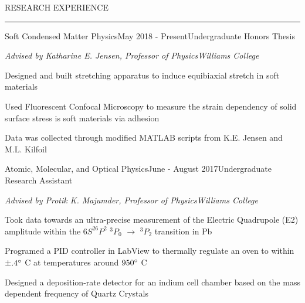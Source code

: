 \documentclass{resume} %
\renewenvironment{rSection}[1]{
	\sectionskip
	\textcolor{RoyalPurple}{\MakeUppercase{#1}}
	\sectionlineskip
	\hrule
	\begin{list}{}{
			\setlength{\leftmargin}{1.5em}
		}
		\item[]
	}{
	\end{list}
}
\begin{document}

	
	\begin{rSection}{Research Experience}
		
		\begin{rSubsection}{Soft Condensed Matter Physics}{May 2018 - Present}{Undergraduate Honors Thesis}{}
			\vspace{-.5em}
				\item[] {\em Advised by Katharine E. Jensen, Professor of Physics}\hfill {\em Williams College}
				\item Designed and built stretching apparatus to induce equibiaxial stretch in soft materials
				\item Used Fluorescent Confocal Microscopy to measure the strain dependency of solid surface stress is soft materials via adhesion
				\item Data was collected through modified MATLAB scripts from K.E. Jensen and M.L. Kilfoil
		
		\end{rSubsection}
%		


		\begin{rSubsection}{Atomic, Molecular, and Optical Physics}{June - August 2017}{Undergraduate Research Assistant}{}
			\vspace{-.5em}
			\item[] {\em Advised by Protik K. Majumder, Professor of Physics}\hfill {\em Williams College}
			\item Took data towards an ultra-precise  measurement of the Electric Quadrupole (E2) amplitude within the $6S^26P^2$ $^3P_0$ $\rightarrow$ $^3P_2$ transition in Pb
			\item Programed a PID controller in LabView to thermally regulate an oven to within $\pm .4\degree$ C at temperatures around $ 950\degree $ C
			\item Designed a deposition-rate detector for an indium cell chamber based on the mass dependent frequency of Quartz Crystals
		\end{rSubsection}

\end{rSection}

\end{document}
